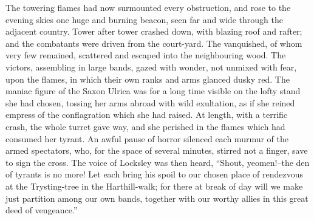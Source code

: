 The towering flames had now surmounted every obstruction, and rose to
the evening skies one huge and burning beacon, seen far and wide through
the adjacent country. Tower after tower crashed down, with blazing roof
and rafter; and the combatants were driven from the court-yard. The
vanquished, of whom very few remained, scattered and escaped into the
neighbouring wood. The victors, assembling in large bands, gazed with
wonder, not unmixed with fear, upon the flames, in which their own ranks
and arms glanced dusky red. The maniac figure of the Saxon Ulrica was
for a long time visible on the lofty stand she had chosen, tossing her
arms abroad with wild exultation, as if she reined empress of the
conflagration which she had raised. At length, with a terrific crash,
the whole turret gave way, and she perished in the flames which had
consumed her tyrant. An awful pause of horror silenced each murmur of
the armed spectators, who, for the space of several minutes, stirred not
a finger, save to sign the cross. The voice of Locksley was then heard,
``Shout, yeomen!--the den of tyrants is no more! Let each bring his
spoil to our chosen place of rendezvous at the Trysting-tree in the
Harthill-walk; for there at break of day will we make just partition
among our own bands, together with our worthy allies in this great deed
of vengeance.''
